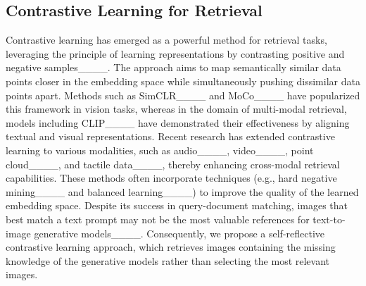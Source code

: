 \subsection{Contrastive Learning for Retrieval}
Contrastive learning has emerged as a powerful method for retrieval tasks, leveraging the principle of learning representations by contrasting positive and negative samples____. The approach aims to map semantically similar data points closer in the embedding space while simultaneously pushing dissimilar data points apart. Methods such as SimCLR____ and MoCo____ have popularized this framework in vision tasks, whereas in the domain of multi-modal retrieval, models including CLIP____ have demonstrated their effectiveness by aligning textual and visual representations. Recent research has extended contrastive learning to various modalities, such as audio____, video____, point cloud____, and tactile data____, thereby enhancing cross-modal retrieval capabilities. These methods often incorporate techniques (e.g., hard negative mining____ and balanced learning____) to improve the quality of the learned embedding space.
Despite its success in query-document matching, images that best match a text prompt may not be the most valuable references for text-to-image generative models____. Consequently, we propose a self-reflective contrastive learning approach, which retrieves images containing the missing knowledge of the generative models rather than selecting the most relevant images.
